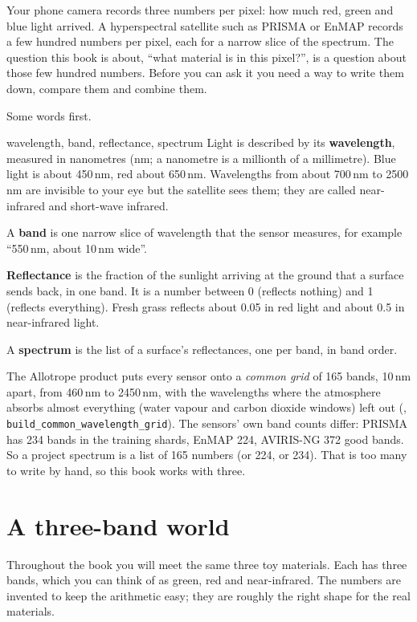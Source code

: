 \documentclass[11pt,a4paper,oneside,openany]{book}
\begin{document}
Your phone camera records three numbers per pixel: how much red, green and blue light arrived. A hyperspectral satellite
such as PRISMA or EnMAP records a few hundred numbers per pixel, each for a narrow slice of the spectrum. The question
this book is about, ``what material is in this pixel?'', is a question about those few hundred numbers. Before you can
ask it you need a way to write them down, compare them and combine them.

Some words first.

\begin{defn}{wavelength, band, reflectance, spectrum}
Light is described by its \textbf{wavelength}, measured in nanometres (nm; a nanometre is a millionth of a millimetre).
Blue light is about 450\,nm, red about 650\,nm. Wavelengths from about 700\,nm to 2500\,nm are invisible to your eye but
the satellite sees them; they are called near-infrared and short-wave infrared.

A \textbf{band} is one narrow slice of wavelength that the sensor measures, for example ``550\,nm, about 10\,nm wide''.

\textbf{Reflectance} is the fraction of the sunlight arriving at the ground that a surface sends back, in one band. It is
a number between 0 (reflects nothing) and 1 (reflects everything). Fresh grass reflects about 0.05 in red light and about
0.5 in near-infrared light.

A \textbf{spectrum} is the list of a surface's reflectances, one per band, in band order.
\end{defn}

The Allotrope product puts every sensor onto a \emph{common grid} of 165 bands, 10\,nm apart, from 460\,nm to 2450\,nm,
with the wavelengths where the atmosphere absorbs almost everything (water vapour and carbon dioxide windows) left out
(, \texttt{build\_common\_wavelength\_grid}). The sensors' own band counts differ:
PRISMA has 234 bands in the training shards, EnMAP 224, AVIRIS-NG 372 good bands. So a project spectrum is a list of
165 numbers (or 224, or 234). That is too many to write by hand, so this book works with three.

\section{A three-band world}

Throughout the book you will meet the same three toy materials. Each has three bands, which you can think of as
green, red and near-infrared. The numbers are invented to keep the arithmetic easy; they are roughly the right shape for
the real materials.
\end{document}
